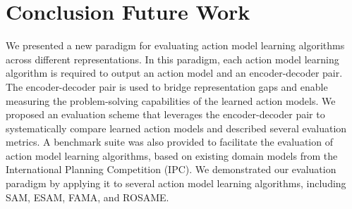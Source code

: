 \documentclass{article}
\theoremstyle{definition}
\theoremstyle{remark}
\newif\ifaddcomments
\newcommand{\roni}[1]{\ifaddcomments{\textcolor{red}{[Roni: #1]}}\fi}
\begin{document}
\section{Conclusion Future Work}
\roni{I'll fix this text later}
We presented a new paradigm for evaluating action 
model learning algorithms across different representations. In this paradigm, each action model learning algorithm is required to output an action model and an encoder-decoder pair. The encoder-decoder pair is used to bridge representation gaps and enable measuring the problem-solving capabilities of the learned action models. We proposed an evaluation scheme that leverages the encoder-decoder pair to systematically compare learned action models and described several evaluation metrics. A benchmark suite was also provided to facilitate the evaluation of action model learning algorithms, based on existing domain models from the International Planning Competition (IPC). We demonstrated our evaluation paradigm by applying it to several action model learning algorithms, including SAM, ESAM, FAMA, and ROSAME.




 
\end{document}
